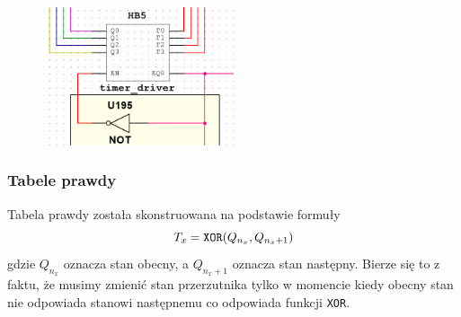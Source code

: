 \documentclass[a4paper]{article}
\begin{document}
\begin{figure}[H]
    \centering
    \includegraphics[width=0.5\textwidth]{timer_driver_black_box.png}
\end{figure}

\pagebreak
\subsubsection{Tabele prawdy}

Tabela prawdy została skonstruowana na podstawie formuły 
\[T_x =  \verb|XOR|(Q_{n_x},  Q_{n_x+1})\]
gdzie $Q_{n_x}$ oznacza stan obecny, a $Q_{n_x+1}$ oznacza stan następny. Bierze się to z faktu, 
że musimy zmienić stan przerzutnika tylko w momencie kiedy obecny stan nie odpowiada stanowi następnemu
co odpowiada funkcji \verb|XOR|.
\end{document}
